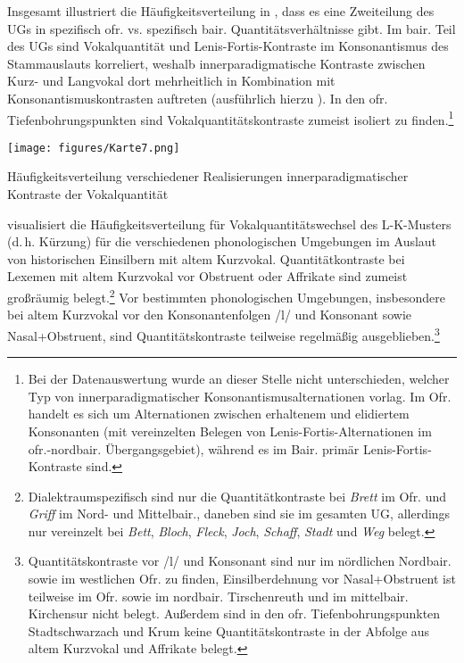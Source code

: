 Insgesamt illustriert die Häufigkeitsverteilung in  , dass es eine Zweiteilung des UGs in spezifisch ofr. vs. spezifisch bair. Quantitätsverhältnisse gibt. Im bair. Teil des UGs sind Vokalquantität und Lenis-Fortis-Kontraste im Konsonantismus des Stammauslauts korreliert, weshalb innerparadigmatische Kontraste zwischen Kurz- und Langvokal dort mehrheitlich in Kombination mit Konsonantismuskontrasten auftreten (ausführlich hierzu ). In den ofr. Tiefenbohrungspunkten sind Vokalquantitätskontraste zumeist isoliert zu finden.\footnote{Bei der Datenauswertung wurde an dieser Stelle nicht unterschieden, welcher Typ von innerparadigmatischer Konsonantismusalternationen vorlag. Im Ofr. handelt es sich um Alternationen zwischen erhaltenem und elidiertem Konsonanten (mit vereinzelten Belegen von Lenis-Fortis-Alternationen im ofr.-nordbair. Übergangsgebiet), während es im Bair. primär Lenis-Fortis-Kontraste sind.}

\vfill
\begin{map}[H]
\texttt{[image: figures/Karte7.png]}
\caption{Häufigkeitsverteilung verschiedener Realisierungen innerparadigmatischer Kontraste der Vokalquantität}
\label{map:7}
\end{map}
\vfill\pagebreak

 visualisiert die Häufigkeitsverteilung für Vokalquantitätswechsel des L-K-Musters (d.\,h. Kürzung) für die verschiedenen phonologischen Umgebungen im Auslaut von historischen Einsilbern mit altem Kurzvokal. Quan\-ti\-tät\-kon\-tras\-te bei Lexemen mit altem Kurzvokal vor Obstruent oder Affrikate sind zumeist großräumig belegt.\footnote{Dialektraumspezifisch sind nur die Quan\-ti\-tät\-kon\-tras\-te bei \textit{Brett} im Ofr. und \textit{Griff} im Nord- und Mittelbair., daneben sind sie im gesamten UG, allerdings nur vereinzelt bei \textit{Bett}, \textit{Bloch}, \textit{Fleck}, \textit{Joch}, \textit{Schaff}, \textit{Stadt} und \textit{Weg} belegt.} Vor bestimmten phonologischen Umgebungen, insbesondere bei altem Kurzvokal vor den Konsonantenfolgen /l/ und Konsonant sowie Nasal+Obstruent, sind Quantitätskontraste teilweise regelmäßig ausgeblieben.\footnote{Quantitätskontraste vor /l/ und Konsonant sind nur im nördlichen Nordbair. sowie im westlichen Ofr. zu finden, Einsilberdehnung vor Nasal+Obstruent ist teilweise im Ofr. sowie im nordbair. Tirschenreuth und im mittelbair. Kirchensur nicht belegt. Außerdem sind in den ofr. Tiefenbohrungspunkten Stadtschwarzach und Krum keine Quantitätskontraste in der Abfolge aus altem Kurzvokal und Affrikate belegt.}

